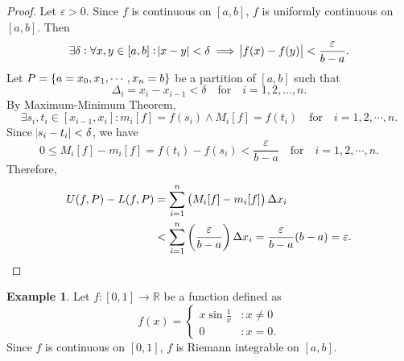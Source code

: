 \documentclass[12pt,openany]{book}
\theoremstyle{definition}
\newtheorem{example}{Example}[chapter]
\newcommand{\R}{\mathbb{R}}
\begin{document}
	\begin{proof}
		Let \(\varepsilon>0\). Since \(f\) is continuous on \([a,b]\), \(f\) is uniformly continuous on \([a,b]\). Then \[
		\exists\delta:\forall x,y\in [a,b]:\abs{x-y}<\delta\implies\abs{f(x)-f(y)}<\frac{\varepsilon}{b-a}.
		\] Let \(P=\set{a=x_0,x_1,\cdots,x_n=b}\) be a partition of \([a,b]\) such that \[
		\Delta_i=x_i-x_{i-1}<\delta\quad\text{for}\quad i=1,2,\dots,n.
		\] By Maximum-Minimum Theorem, \[
		\exists s_i,t_i\in[x_{i-1},x_i]: m_i[f]=f(s_i)\land M_i[f]=f(t_i)\quad\text{for}\quad i=1,2,\cdots,n.
		\] Since \(\abs{s_i-t_i}<\delta\), we have \[
		0\leq M_i[f]-m_i[f] = f(t_i)-f(s_i)<\frac{\varepsilon}{b-a}\quad\text{for}\quad i=1,2,\cdots,n.
		\] Therefore, \begin{align*}
			U(f,P)-L(f,P)&=\sum_{i=1}^n\del{M_i[f]-m_i[f]}\Delta x_i\\
			&<\sum_{i=1}^n\del{\frac{\varepsilon}{b-a}}\Delta x_i=\frac{\varepsilon}{b-a}(b-a)=\varepsilon.
		\end{align*}
	\end{proof}
	\vspace{8pt}
	\begin{example}
		Let \(f:[0,1]\to\R\) be a function defined as \[
		f(x)=\begin{cases}
			x\sin\frac{1}{x} &:x\neq 0\\
			0 &:x = 0.
		\end{cases}
		\] Since \(f\) is continuous on \([0,1]\), \(f\) is Riemann integrable on \([a,b]\).
	\end{example}
	
\end{document}
